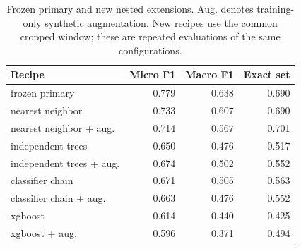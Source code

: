 \begin{table}[htbp]\centering\small
\caption{Frozen primary and new nested extensions. Aug. denotes training-only synthetic augmentation. New recipes use the common cropped window; these are repeated evaluations of the same configurations.}\label{tab:extensions}
\begin{tabular}{lrrr}\toprule Recipe & Micro F1 & Macro F1 & Exact set\\\midrule
frozen primary & 0.779 & 0.638 & 0.690\\
nearest neighbor & 0.733 & 0.607 & 0.690\\
nearest neighbor + aug. & 0.714 & 0.567 & 0.701\\
independent trees & 0.650 & 0.476 & 0.517\\
independent trees + aug. & 0.674 & 0.502 & 0.552\\
classifier chain & 0.671 & 0.505 & 0.563\\
classifier chain + aug. & 0.663 & 0.476 & 0.552\\
xgboost & 0.614 & 0.440 & 0.425\\
xgboost + aug. & 0.596 & 0.371 & 0.494\\
\bottomrule\end{tabular}\end{table}

